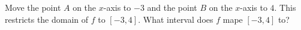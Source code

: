 \documentclass{ximera}
\author{Kevin James}
\begin{document}
   \begin{exercise}
   	  \begin{center}
   	  	\begin{onlineOnly}
   	    \end{onlineOnly} 
     \end{center}
   	 Move the point $ A $ on the $ x $-axis to $ -3 $ and the point $ B $ on the $ x $-axis to $ 4 $.  This restricts the domain of $ f $ to $ [-3, 4] $.  What interval does $ f $ mape $ [-3, 4] $ to?
   	 \begin{multipleChoice}
   	   \choice{$ \left[f(-3), f(4)\right] $}
   	   \choice{$ [1.576, -1.2] $}
   	   \choice[correct]{$ [-1.428, 2.102] $}
   	 \end{multipleChoice}
    
   \end{exercise}
\end{document}
